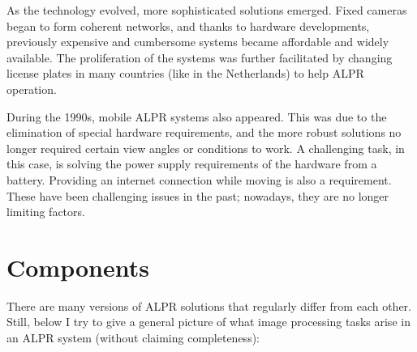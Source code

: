 As the technology evolved, more sophisticated solutions emerged. Fixed cameras began to form coherent networks, and thanks to hardware developments, previously expensive and cumbersome systems became affordable and widely available. The proliferation of the systems was further facilitated by changing license plates in many countries (like in the Netherlands) to help ALPR operation\cite{DutchLicensePlates}.

During the 1990s, mobile ALPR systems also appeared. This was due to the elimination of special hardware requirements, and the more robust solutions no longer required certain view angles or conditions to work. A challenging task, in this case, is solving the power supply requirements of the hardware from a battery. Providing an internet connection while moving is also a requirement. These have been challenging issues in the past; nowadays, they are no longer limiting factors.

\section{Components}

There are many versions of ALPR solutions that regularly differ from each other. Still, below I try to give a general picture of what image processing tasks arise in an ALPR system\cite{ANPR} (without claiming completeness):

